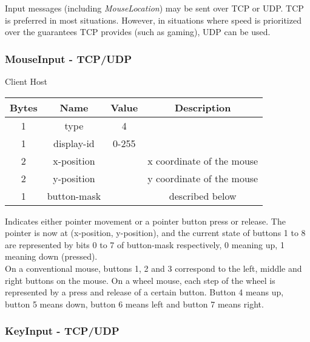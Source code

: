 \documentclass{article}
\begin{document}
    Input messages (including \emph{MouseLocation}) may be sent over TCP or UDP. TCP is preferred in most situations. However, in situations where speed is prioritized over the guarantees TCP provides (such as gaming), UDP can be used.

    \subsubsection{MouseInput - TCP/UDP}

    \begin{center}
        Client \textrightarrow Host\\
        \begin{tabular}{|c|c|c|c|}
            \hline
            \textbf{Bytes} & \textbf{Name} & \textbf{Value} & \textbf{Description}      \\
            \hline
            1              & type          & 4              &                           \\
            \hline
            1              & display-id    & 0-255          &                           \\
            \hline
            2              & x-position    &                & x coordinate of the mouse \\
            \hline
            2              & y-position    &                & y coordinate of the mouse \\
            \hline
            1              & button-mask   &                & described below           \\
            \hline
        \end{tabular}
    \end{center}

    Indicates either pointer movement or a pointer button press or release. The pointer is now at (x-position, y-position), and the current state of buttons 1 to 8 are represented by bits 0 to 7 of button-mask respectively, 0 meaning up, 1 meaning down (pressed).\\

    On a conventional mouse, buttons 1, 2 and 3 correspond to the left, middle and right buttons on the mouse. On a wheel mouse, each step of the wheel is represented by a press and release of a certain button. Button 4 means up, button 5 means down, button 6 means left and button 7 means right.

    \subsubsection{KeyInput - TCP/UDP}
\end{document}
